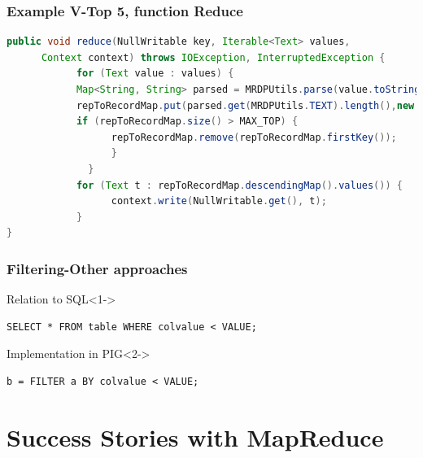 \documentclass[xcolor=dvipsnames,dvip,notes=show,table]{beamer}
\begin{document}
\begin{frame}[fragile]
  \frametitle{Example V-Top 5, function Reduce}

\begin{lstlisting}[language=Java]
public void reduce(NullWritable key, Iterable<Text> values,
      Context context) throws IOException, InterruptedException {
            for (Text value : values) {
            Map<String, String> parsed = MRDPUtils.parse(value.toString());
            repToRecordMap.put(parsed.get(MRDPUtils.TEXT).length(),new Text(value));
            if (repToRecordMap.size() > MAX_TOP) {
                  repToRecordMap.remove(repToRecordMap.firstKey());
                  }
              }
            for (Text t : repToRecordMap.descendingMap().values()) {
                  context.write(NullWritable.get(), t);
            }
}
\end{lstlisting}

\end{frame}




\begin{frame}[fragile]
  \frametitle{Filtering-Other approaches}
  \begin{block}{Relation to SQL}<1->
  
  \begin{lstlisting}
SELECT * FROM table WHERE colvalue < VALUE;
\end{lstlisting}
\end{block}

\begin{exampleblock}{Implementation in PIG}<2->

\begin{lstlisting}
b = FILTER a BY colvalue < VALUE;
\end{lstlisting}

\end{exampleblock}

\end{frame}





\section{Success Stories with MapReduce}
\end{document}
